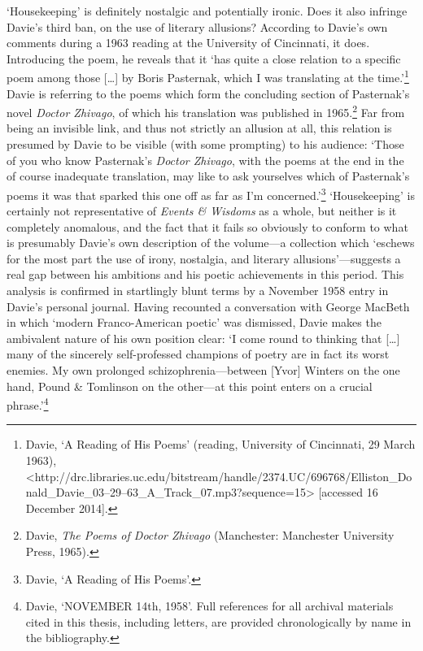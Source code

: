\documentclass[]{article}
\begin{document}
‘Housekeeping’ is definitely nostalgic and potentially ironic. Does it
also infringe Davie’s third ban, on the use of literary allusions?
According to Davie’s own comments during a 1963 reading at the
University of Cincinnati, it does. Introducing the poem, he reveals that
it ‘has quite a close relation to a specific poem among those
{[}\ldots{}{]} by Boris Pasternak, which I was translating at the
time.’\footnote{Davie, ‘A Reading of His Poems’ (reading, University of
  Cincinnati, 29 March 1963),
  \textless{}http://drc.libraries.uc.edu\slash bitstream\slash handle\slash 2374.UC\slash 696768\slash Elliston\_Donald\_Davie\_03–29–63\_A\_Track\_07.mp3?sequence=15\textgreater{}
  {[}accessed 16 December 2014{]}.} Davie is referring to the poems
which form the concluding section of Pasternak’s novel \emph{Doctor
Zhivago}, of which his translation was published in 1965.\footnote{Davie,
  \emph{The Poems of Doctor Zhivago} (Manchester: Manchester University
  Press, 1965).} Far from being an invisible link, and thus not strictly
an allusion at all, this relation is presumed by Davie to be visible
(with some prompting) to his audience: ‘Those of you who know
Pasternak’s \emph{Doctor Zhivago}, with the poems at the end in the of
course inadequate translation, may like to ask yourselves which of
Pasternak’s poems it was that sparked this one off as far as I’m
concerned.’\footnote{Davie, ‘A Reading of His Poems’.} ‘Housekeeping’ is
certainly not representative of \emph{Events \& Wisdoms} as a whole, but
neither is it completely anomalous, and the fact that it fails so
obviously to conform to what is presumably Davie’s own description of
the volume—a collection which ‘eschews for the most part the use of
irony, nostalgia, and literary allusions’—suggests a real gap between
his ambitions and his poetic achievements in this period. This analysis
is confirmed in startlingly blunt terms by a November 1958 entry in
Davie’s personal journal. Having recounted a conversation with George
MacBeth in which ‘modern Franco-American poetic’ was dismissed, Davie
makes the ambivalent nature of his own position clear: ‘I come round to
thinking that {[}\ldots{}{]} many of the sincerely self-professed
champions of poetry are in fact its worst enemies. My own prolonged
schizophrenia—between {[}Yvor{]} Winters on the one hand, Pound \&
Tomlinson on the other—at this point enters on a crucial
phrase.’\footnote{Davie, ‘NOVEMBER 14th, 1958’. Full references for all
  archival materials cited in this thesis, including letters, are
  provided chronologically by name in the bibliography.}
\end{document}

